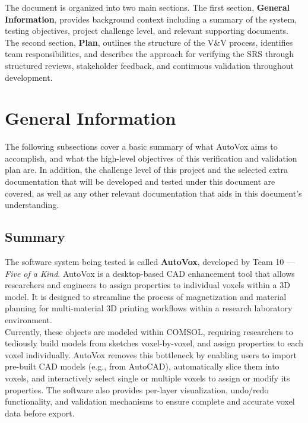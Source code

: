 \documentclass[12pt, titlepage]{article}
\begin{document}
\noindent The document is organized into two main sections. The first section, \textbf{General Information}, provides background context including a summary of the system, testing objectives, project challenge level, and relevant supporting documents. The second section, \textbf{Plan}, outlines the structure of the V\&V process, identifies team responsibilities, and describes the approach for verifying the SRS through structured reviews, stakeholder feedback, and continuous validation throughout development.\\

\section{General Information}

The following subsections cover a basic summary of what AutoVox aims to accomplish, and what the high-level objectives of this verification and validation plan are. In addition, the challenge level of this project and the selected extra documentation that will be developed and tested under this document are covered, as well as any other relevant documentation that aids in this document's understanding. \\

\subsection{Summary}

The software system being tested is called \textbf{AutoVox}, developed by Team 10 --- \textit{Five of a Kind}. AutoVox is a desktop-based CAD enhancement tool that allows researchers and engineers to assign properties to individual voxels within a 3D model. It is designed to streamline the process of magnetization and material planning for multi-material 3D printing workflows within a research laboratory environment.\\

\noindent Currently, these objects are modeled within COMSOL, requiring researchers to tediously build models from sketches voxel-by-voxel, and assign properties to each voxel individually. AutoVox removes this bottleneck by enabling users to import pre-built CAD models (e.g., from AutoCAD), automatically slice them into voxels, and interactively select single or multiple voxels to assign or modify its properties. The software also provides per-layer visualization, undo/redo functionality, and validation mechanisms to ensure complete and accurate voxel data before export.\\
\end{document}
